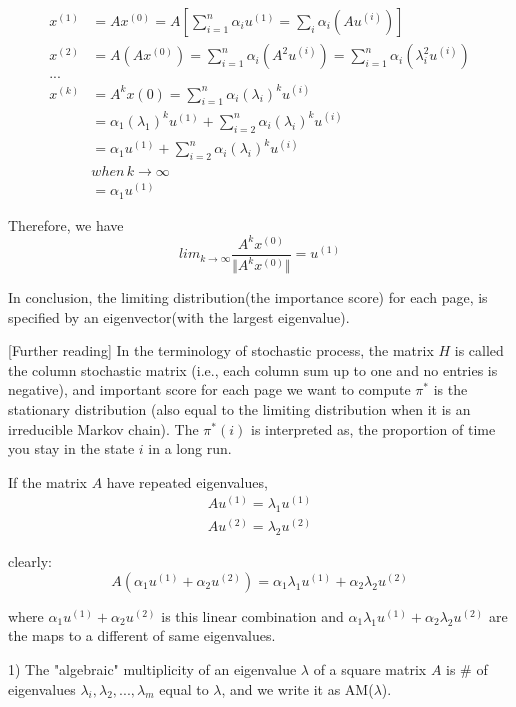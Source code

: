 \begin{align*}
x^{(1)} &= Ax^{(0)} = A[\sum^n_{i=1}\alpha_iu^{(1)} = \sum_i\alpha_i(Au^{(i)})]\\
x^{(2)} &= A(Ax^{(0)}) = \sum^n_{i=1}\alpha_i(A^2u^{(i)}) = \sum^n_{i=1}\alpha_i(\lambda_i^2u^{(i)})\\
...\\
x^{(k)} &= A^kx{(0)} = \sum^n_{i=1}\alpha_i(\lambda_i)^ku^{(i)}\\
&= \alpha_1(\lambda_1)^ku^{(1)} + \sum^n_{i=2}\alpha_i(\lambda_i)^ku^{(i)} \\
&= \alpha_1u^{(1)} + \sum^n_{i=2}\alpha_i(\lambda_i)^ku^{(i)}\\
&when \,k \rightarrow \infty\\
&= \alpha_1u^{(1)}
\end{align*}

Therefore, we have
$$lim_{k\rightarrow \infty}\frac{A^kx^{(0)}}{\Vert A^kx^{(0)}\Vert} =u^{(1)}$$

In conclusion, the limiting distribution(the importance score) for each page, is specified by an eigenvector(with the largest eigenvalue).

[Further reading] In the terminology of stochastic process, the matrix $H$ is called the column stochastic matrix (i.e., each column sum up to one and no entries is negative), and important score for each page we want to compute $\pi^*$ is the stationary distribution (also equal to the limiting distribution when it is an irreducible Markov chain). The $\pi^*(i)$ is interpreted as, the proportion of time you stay in the state $i$ in a long run. 



If the matrix $A$ have repeated eigenvalues, 
\begin{align*}
Au^{(1)} =\lambda_1u^{(1)}\\
Au^{(2)} =\lambda_2u^{(2)}
\end{align*}

clearly:
\begin{equation*}
A(\alpha_1u^{(1)} + \alpha_2u^{(2)}) = \alpha_1\lambda_1u^{(1)} + \alpha_2\lambda_2u^{(2)}
\end{equation*}

where $\alpha_1u^{(1)} + \alpha_2u^{(2)}$ is this linear combination and $\alpha_1\lambda_1u^{(1)} + \alpha_2\lambda_2u^{(2)}$ are the maps to a different of same eigenvalues.

1) The "algebraic" multiplicity of an eigenvalue $\lambda$ of a square matrix $A$ is \# of eigenvalues $\lambda_i, \lambda_2,...,\lambda_m$ equal to $\lambda$, and we write it as AM($\lambda$).

